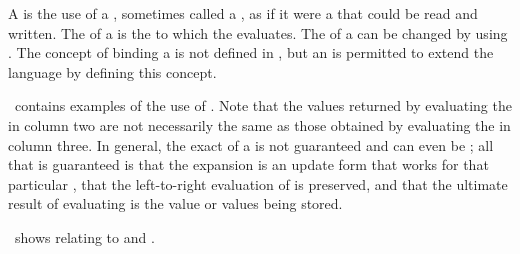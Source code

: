 


A  is the use of a ,
sometimes called a ,
as if it were a  that could be read and written.
The  of a  is 
the  to which the   evaluates.
The  of a  can be changed by using .
The concept of binding a  is not defined in \clisp,
but an  is permitted to extend the language by defining this concept.

\Thenextfigure\ contains examples of the use of .
Note that the values returned by evaluating the  in column two 
are not necessarily the same as those obtained by evaluating the 
 in column three.
In general, the exact  of a   is not guaranteed 
and can even be ;
all that is guaranteed is 
 that the expansion is an update form that works
   for that particular ,
 that the left-to-right evaluation of  is preserved, 
and
 that the ultimate result of evaluating  is the value
  or values being stored.


\Thenextfigure\ shows  relating to
 and .




